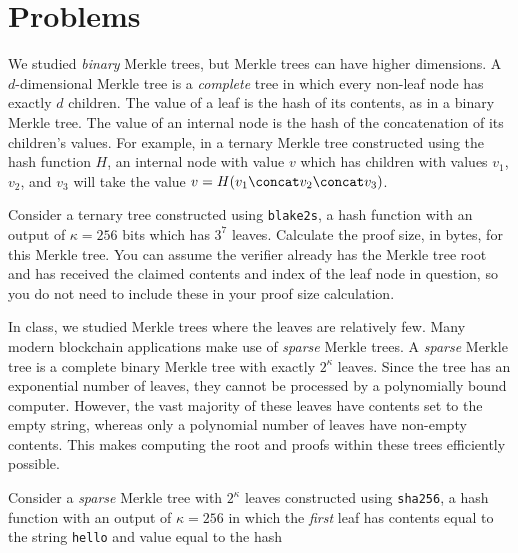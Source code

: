 \section*{Problems}

\begin{problems}
    \item We studied \emph{binary} Merkle trees, but Merkle trees can have
          higher dimensions. A $d$-dimensional Merkle tree is a \emph{complete}
          tree in which every non-leaf node has exactly $d$ children. The value
          of a leaf is the hash of its contents, as in a binary Merkle tree. The
          value of an internal node is the hash of the concatenation of its
          children's values. For example, in a ternary Merkle tree constructed
          using the hash function $H$, an internal node with value $v$ which has
          children with values $v_1$, $v_2$, and $v_3$ will take the value
          $v = H(v_1 \concat v_2 \concat v_3)$.

          Consider a ternary tree constructed using \texttt{blake2s}, a hash
          function with an output of $\kappa = 256$ bits which has $3^7$ leaves.
          Calculate the proof size, in bytes, for this Merkle tree. You can
          assume the verifier already has the Merkle tree root and has received
          the claimed contents and index of the leaf node in question, so you do
          not need to include these in your proof size calculation.

    \item In class, we studied Merkle trees where the leaves are relatively few.
          Many modern blockchain applications make use of \emph{sparse} Merkle
          trees. A \emph{sparse} Merkle tree is a complete binary Merkle tree
          with exactly $2^\kappa$ leaves. Since the tree has an exponential
          number of leaves, they cannot be processed by a polynomially bound
          computer. However, the vast majority of these leaves have contents set
          to the empty string, whereas only a polynomial number of leaves have
          non-empty contents. This makes computing the root and proofs within
          these trees efficiently possible.

          Consider a \emph{sparse} Merkle tree with $2^\kappa$ leaves
          constructed using \texttt{sha256}, a hash function with an output of
          $\kappa = 256$ in which the \emph{first} leaf has contents equal to
          the string \texttt{hello} and value equal to the hash


\end{problems}
